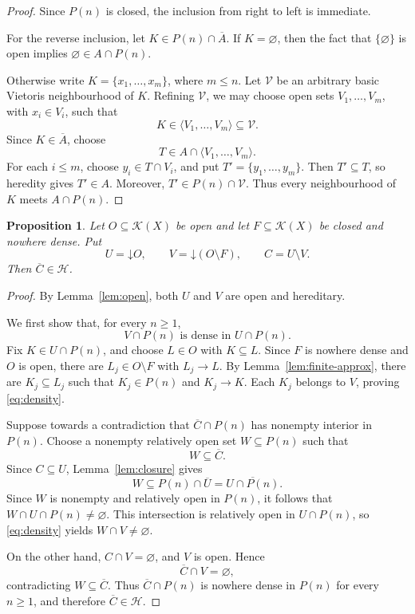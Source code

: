 \documentclass[10pt,a4paper]{amsart}
\newtheorem{proposition}[theorem]{Proposition}
\newcommand{\K}{\mathcal K}
\newcommand{\HH}{\mathcal H}
\newcommand{\cl}[1]{\overline{#1}}
\newcommand{\down}[1]{\mathord{\downarrow}\!#1}
\begin{document}
\begin{proof}
Since $P(n)$ is closed, the inclusion from right to left is immediate.

For the reverse inclusion, let $K\in P(n)\cap\cl A$. If $K=\varnothing$,
then the fact that $\{\varnothing\}$ is open implies
$\varnothing\in A\cap P(n)$.

Otherwise write $K=\{x_1,\ldots,x_m\}$, where $m\leq n$. Let
$\mathcal V$ be an arbitrary basic Vietoris neighbourhood of $K$.
Refining $\mathcal V$, we may choose open sets $V_1,\ldots,V_m$, with
$x_i\in V_i$, such that
\[
K\in\langle V_1,\ldots,V_m\rangle\subseteq\mathcal V.
\]
Since $K\in\cl A$, choose
\[
T\in A\cap\langle V_1,\ldots,V_m\rangle.
\]
For each $i\leq m$, choose $y_i\in T\cap V_i$, and put
$T'=\{y_1,\ldots,y_m\}$. Then $T'\subseteq T$, so heredity gives
$T'\in A$. Moreover, $T'\in P(n)\cap\mathcal V$. Thus every
neighbourhood of $K$ meets $A\cap P(n)$.
\end{proof}


\begin{proposition}\label{prop:local}
Let $O\subseteq\K(X)$ be open and let $F\subseteq\K(X)$ be closed and
nowhere dense. Put
\[
U=\down O,\qquad
V=\down(O\setminus F),\qquad
C=U\setminus V.
\]
Then $\cl C\in\HH$.
\end{proposition}

\begin{proof}
By Lemma~\ref{lem:open}, both $U$ and $V$ are open and hereditary.

We first show that, for every $n\geq1$,
\begin{equation}\label{eq:density}
V\cap P(n)\text{ is dense in }U\cap P(n).
\end{equation}
Fix $K\in U\cap P(n)$, and choose $L\in O$ with $K\subseteq L$.
Since $F$ is nowhere dense and $O$ is open, there are
$L_j\in O\setminus F$ with $L_j\to L$. By
Lemma~\ref{lem:finite-approx}, there are $K_j\subseteq L_j$ such that
$K_j\in P(n)$ and $K_j\to K$. Each $K_j$ belongs to $V$, proving
\eqref{eq:density}.

Suppose towards a contradiction that $\cl C\cap P(n)$ has nonempty
interior in $P(n)$. Choose a nonempty relatively open set
$W\subseteq P(n)$ such that
\[
W\subseteq\cl C.
\]
Since $C\subseteq U$, Lemma~\ref{lem:closure} gives
\[
W\subseteq P(n)\cap\cl U=\cl{U\cap P(n)}.
\]
Since $W$ is nonempty and relatively open in $P(n)$, it follows that
$W\cap U\cap P(n)\neq\varnothing$. This intersection is relatively open
in $U\cap P(n)$, so \eqref{eq:density} yields $W\cap V\neq\varnothing$.

On the other hand, $C\cap V=\varnothing$, and $V$ is open. Hence
\[
\cl C\cap V=\varnothing,
\]
contradicting $W\subseteq\cl C$. Thus $\cl C\cap P(n)$ is nowhere
dense in $P(n)$ for every $n\geq1$, and therefore $\cl C\in\HH$.
\end{proof}
\end{document}
